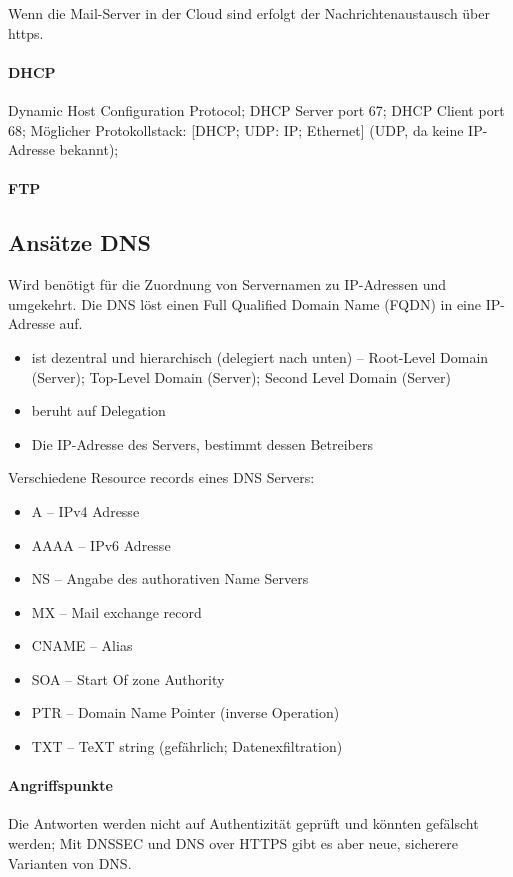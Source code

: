 \documentclass[a4paper,12pt]{article}
\begin{document}
Wenn die Mail-Server in der Cloud sind erfolgt der Nachrichtenaustausch über https.

\paragraph{DHCP} Dynamic Host Configuration Protocol; DHCP Server port 67; DHCP Client port 68; Möglicher Protokollstack: [DHCP; UDP: IP; Ethernet] (UDP, da keine IP-Adresse bekannt);


\paragraph{FTP}

\subsection{Ansätze DNS}
Wird benötigt für die Zuordnung von Servernamen zu IP-Adressen und umgekehrt. Die DNS löst einen Full Qualified Domain Name (FQDN) in eine IP-Adresse auf.

\begin{itemize}
\item ist dezentral und hierarchisch (delegiert nach unten) -- Root-Level Domain (Server); Top-Level Domain (Server); Second Level Domain (Server)
\item beruht auf Delegation
\item Die IP-Adresse des Servers, bestimmt dessen Betreibers
\end{itemize}

Verschiedene Resource records eines DNS Servers:
\begin{itemize}
\item A -- IPv4 Adresse
\item AAAA -- IPv6 Adresse
\item NS -- Angabe des authorativen Name Servers
\item MX -- Mail exchange record
\item CNAME -- Alias
\item SOA -- Start Of zone Authority
\item PTR -- Domain Name Pointer (inverse Operation)
\item TXT -- TeXT string (gefährlich; Datenexfiltration)
\end{itemize}

\paragraph{Angriffspunkte} Die Antworten werden nicht auf Authentizität geprüft und könnten gefälscht werden; Mit DNSSEC und DNS over HTTPS gibt es aber neue, sicherere Varianten von DNS.
\end{document}
